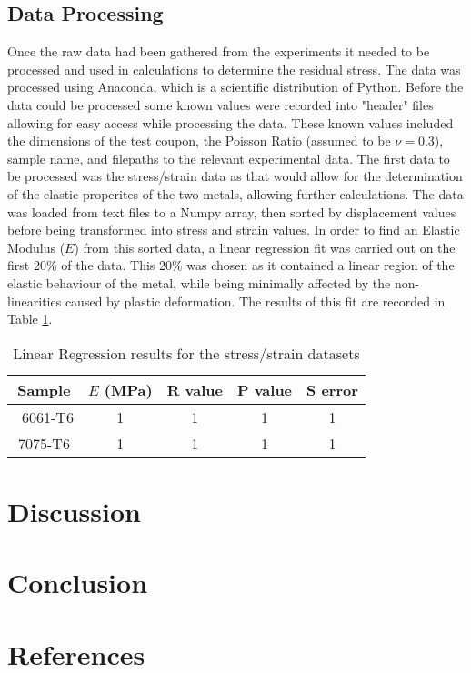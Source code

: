 \documentclass[11pt, oneside]{article}   	%
\begin{document}
\subsection{Data Processing}
Once the raw data had been gathered from the experiments it needed to be processed and used in calculations to determine the residual stress. The data was processed using Anaconda, which is a scientific distribution of Python.
Before the data could be processed some known values were recorded into "header" files allowing for easy access while processing the data. These known values included the dimensions of the test coupon, the Poisson Ratio (assumed to be $\nu = 0.3$), sample name, and filepaths to the relevant experimental data.
The first data to be processed was the stress/strain data as that would allow for the determination of the elastic properites of the two metals, allowing further calculations. The data was loaded from text files to a Numpy array, then sorted by displacement values before being transformed into stress and strain values.
In order to find an Elastic Modulus ($E$) from this sorted data, a linear regression fit was carried out on the first 20\% of the data. This 20\% was chosen as it contained a linear region of the elastic behaviour of the metal, while being minimally affected by the non-linearities caused by plastic deformation. The results of this fit are recorded in Table \ref{tab:b}. 
\begin{table}[h]
	\centering
	\caption{Linear Regression results for the stress/strain datasets}\label{tab:b}
	\begin{tabular}[c]{c | c c c c}
	Sample & $E$ (\si{\mega\pascal}) & R value & P value & S error \\ \hline\
	6061-T6 & 1 & 1 & 1 & 1 \\
	7075-T6 & 1 & 1 & 1 & 1 \\
	\end{tabular}
\end{table}

\section{Discussion}
\section{Conclusion}
\section{References}
\end{document}
